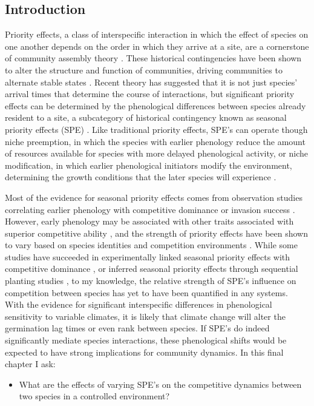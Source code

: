 \documentclass{article}\usepackage[]{graphicx}\usepackage[]{color}
\begin{document}
\subsection*{Introduction}
\indent\indent Priority effects, a class of interspecific interaction in which the effect of species on one another depends on the order in which they arrive at a site, are a cornerstone of community assembly theory \citep{Fukami2015}. These historical contingencies have been shown to alter the structure and function of communities, driving communities to alternate stable states \citep{Fukami2011}. Recent theory has suggested that it is not just species' arrival times that determine the course of interactions, but significant priority effects can be determined by the phenological differences between species already resident to a site, a subcategory of historical contingency known as seasonal priority effects (SPE) \citep{Wainwright2012}. Like traditional priority effects, SPE's can operate though niche preemption, in which the species with earlier phenology reduce the amount of resources available for species with more delayed phenological activity, or niche modification, in which earlier phenological initiators modify the environment, determining the growth conditions that the later species will experience \citep{Fukami2015}.
\par Most of the evidence for seasonal priority effects comes from observation studies correlating earlier phenology with competitive dominance or invasion success \citep{Gioria2018}. However, early phenology may be associated with other traits associated with superior competitive ability \citep{Dickson2012}, and the strength of priority effects have been shown to vary based on species identities \citep{Cleland2015} and competition environments \citep{Kardol2013}. While some studies have succeeded in experimentally linked seasonal priority effects with competitive dominance \citep{Wainwright2012}, or inferred seasonal priority effects through sequential planting studies \citep{Korner2008}, to my knowledge, the relative strength of SPE's influence on competition between species has yet to have been quantified in any systems.\\
\indent With the evidence for significant interspecific differences in phenological sensitivity to variable climates, it is likely that climate change will alter the germination lag times or even rank between species. If SPE's do indeed significantly mediate species interactions, these phenological shifts would be expected to have strong implications for community dynamics. In this final chapter I ask:
\begin{itemize}
\item What are the effects of varying SPE's on the competitive dynamics between two species in a controlled environment?
\end{itemize}
\end{document}
